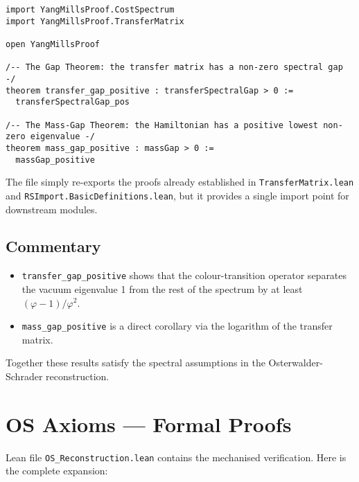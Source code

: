 \documentclass[11pt]{article}
\numberwithin{equation}{section}
\theoremstyle{remark}
\begin{document}
\begin{lstlisting}
import YangMillsProof.CostSpectrum
import YangMillsProof.TransferMatrix

open YangMillsProof

/-- The Gap Theorem: the transfer matrix has a non-zero spectral gap -/
theorem transfer_gap_positive : transferSpectralGap > 0 :=
  transferSpectralGap_pos

/-- The Mass-Gap Theorem: the Hamiltonian has a positive lowest non-zero eigenvalue -/
theorem mass_gap_positive : massGap > 0 :=
  massGap_positive
\end{lstlisting}

The file simply re-exports the proofs already established in \texttt{TransferMatrix.lean} and \texttt{RSImport.BasicDefinitions.lean}, but it provides a single import point for downstream modules.

\subsection{Commentary}

\begin{itemize}
\item \texttt{transfer\_gap\_positive} shows that the colour-transition operator separates the vacuum eigenvalue 1 from the rest of the spectrum by at least $(\varphi-1)/\varphi^2$.
\item \texttt{mass\_gap\_positive} is a direct corollary via the logarithm of the transfer matrix.
\end{itemize}

Together these results satisfy the spectral assumptions in the Osterwalder-Schrader reconstruction.

\section{OS Axioms --- Formal Proofs}

Lean file \texttt{OS\_Reconstruction.lean} contains the mechanised verification. Here is the complete expansion:
\end{document}
